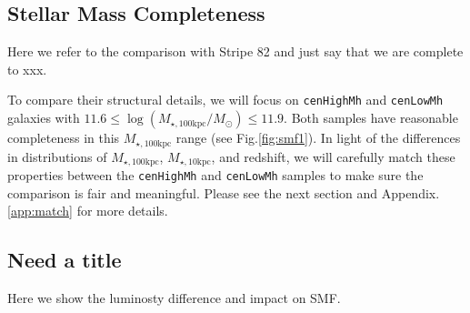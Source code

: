\documentclass{emulateapj}
\def\rbcg{\texttt{cenHighMh}}
\def\nbcg{\texttt{cenLowMh}}
\def\minn{{$M_{\star,10\mathrm{kpc}}$}}
\def\mtot{{$M_{\star,100\mathrm{kpc}}$}}
\def\logmtot{{$\log (M_{\star,100\mathrm{kpc}}/M_{\odot})$}}
\newcommand{\update}[1]{\textcolor{Bittersweet}{#1}}
\begin{document}
\begin{CJK*}{UTF8}{gbsn}
    \subsection{Stellar Mass Completeness}
    
    Here we refer to the comparison with Stripe 82 and just say that we are complete to xxx.
    
    \update{To compare their structural details, we will focus on \rbcg{} and 
    \nbcg{} galaxies with $11.6 \le$\logmtot{}$\le 11.9$.  
    Both samples have reasonable completeness in this \mtot{} range
    (see Fig.\ref{fig:smf1}).
    In light of the differences in distributions of \mtot{}, \minn{}, and redshift, 
    we will carefully match these properties between the \rbcg{} and \nbcg{}
    samples to make sure the comparison is fair and meaningful.  
    Please see the next section and Appendix.\ref{app:match} for more details.}
    
    \subsection{Need a title}
    \label{ssec:s82}

Here we show the luminosty difference and impact on SMF.


\end{CJK*}
\end{document}
